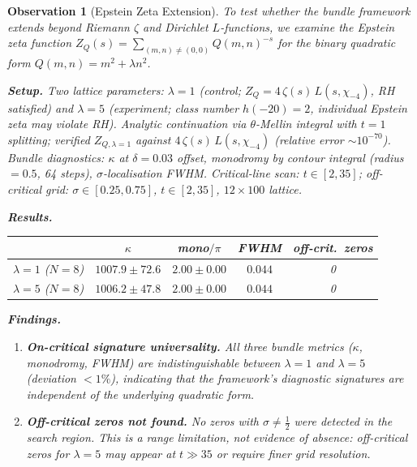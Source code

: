 \documentclass[11pt, a4paper]{article}
\theoremstyle{definition}
\theoremstyle{plain}
\newtheorem{observation}[theorem]{Observation}
\begin{document}
\begin{observation}[Epstein Zeta Extension]
\label{obs:epstein_extension}
To test whether the bundle framework extends beyond Riemann $\zeta$ and
Dirichlet $L$-functions, we examine the Epstein zeta function
$Z_Q(s) = \sum_{(m,n)\neq(0,0)} Q(m,n)^{-s}$ for the binary quadratic
form $Q(m,n) = m^2 + \lambda n^2$.

\smallskip\noindent
\textbf{Setup.}  Two lattice parameters: $\lambda=1$ (control;
$Z_Q = 4\,\zeta(s)\,L(s,\chi_{-4})$, RH satisfied) and $\lambda=5$
(experiment; class number $h(-20)=2$, individual Epstein zeta may
violate RH).  Analytic continuation via $\theta$-Mellin integral with
$t=1$ splitting; verified $Z_{Q,\lambda=1}$ against $4\,\zeta(s)\,L(s,\chi_{-4})$
(relative error $\sim 10^{-70}$).  Bundle diagnostics:
$\kappa$ at $\delta=0.03$ offset, monodromy by contour integral
(radius $=0.5$, 64 steps), $\sigma$-localisation FWHM.
Critical-line scan: $t\in[2,35]$; off-critical grid:
$\sigma\in[0.25,0.75]$, $t\in[2,35]$, $12\times 100$ lattice.

\smallskip\noindent
\textbf{Results.}

\begin{center}
\small
\begin{tabular}{@{} l c c c c @{}}
\toprule
& $\kappa$ & mono$/\pi$ & FWHM & off-crit.\ zeros \\
\midrule
$\lambda=1$ ($N=8$) & $1007.9 \pm 72.6$ & $2.00 \pm 0.00$ & $0.044$ & 0 \\
$\lambda=5$ ($N=8$) & $1006.2 \pm 47.8$ & $2.00 \pm 0.00$ & $0.044$ & 0 \\
\bottomrule
\end{tabular}
\end{center}

\smallskip\noindent
\textbf{Findings.}
\begin{enumerate}
  \item \textbf{On-critical signature universality.}
        All three bundle metrics ($\kappa$, monodromy, FWHM) are
        indistinguishable between $\lambda=1$ and $\lambda=5$
        (deviation ${}<1\%$), indicating that the framework's
        diagnostic signatures are independent of the underlying
        quadratic form.

  \item \textbf{Off-critical zeros not found.}
        No zeros with $\sigma\neq\tfrac{1}{2}$ were detected in the
        search region.  This is a \emph{range limitation}, not evidence
        of absence: off-critical zeros for $\lambda=5$ may appear at
        $t \gg 35$ or require finer grid resolution.
\end{enumerate}


\end{observation}
\end{document}

